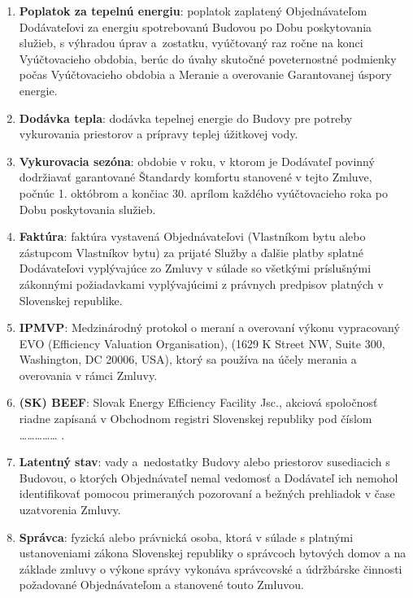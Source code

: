 \begin{multicols}{2}
\begin{enumerate}
\item\textbf{Poplatok za tepelnú energiu}: poplatok zaplatený Objednávateľom
Dodávateľovi za energiu spotrebovanú Budovou po Dobu poskytovania
služieb, s výhradou úprav a~zostatku, vyúčtovaný raz ročne na konci
Vyúčtovacieho obdobia, berúc do úvahy skutočné poveternostné podmienky
počas Vyúčtovacieho obdobia a Meranie a overovanie Garantovanej úspory
energie.

\item\textbf{Dodávka tepla}: dodávka tepelnej energie do Budovy pre potreby
vykurovania priestorov a prípravy teplej úžitkovej vody.

\item\textbf{Vykurovacia sezóna}: obdobie v roku, v ktorom je Dodávateľ
povinný dodržiavať garantované Štandardy komfortu stanovené v tejto
Zmluve, počnúc 1. októbrom a končiac 30. aprílom každého vyúčtovacieho
roka po Dobu poskytovania služieb.

\item\textbf{Faktúra}: faktúra vystavená Objednávateľovi (Vlastníkom bytu
alebo zástupcom Vlastníkov bytu) za prijaté Služby a ďalšie platby
splatné Dodávateľovi vyplývajúce zo Zmluvy v súlade so všetkými
príslušnými zákonnými požiadavkami vyplývajúcimi z právnych predpisov
platných v Slovenskej republike.

\item\textbf{IPMVP}: Medzinárodný protokol o meraní a overovaní výkonu
vypracovaný EVO (Efficiency Valuation Organisation), (1629 K Street NW,
Suite 300, Washington, DC 20006, USA), ktorý sa používa na účely merania
a overovania v rámci Zmluvy.

\item\textbf{(SK) BEEF}: Slovak Energy Efficiency Facility Jsc., akciová
spoločnosť riadne zapísaná v Obchodnom registri Slovenskej republiky pod
číslom \ldots\ldots\ldots\ldots\ldots{} .

\item\textbf{Latentný stav}: vady a~nedostatky Budovy alebo priestorov
susediacich s Budovou, o ktorých Objednávateľ nemal vedomosť a Dodávateľ
ich nemohol identifikovať pomocou primeraných pozorovaní a bežných
prehliadok v čase uzatvorenia Zmluvy.

\item\textbf{Správca}: fyzická alebo právnická osoba, ktorá v súlade s
platnými ustanoveniami zákona Slovenskej republiky o správcoch bytových
domov a na základe zmluvy o výkone správy vykonáva správcovské a
údržbárske činnosti požadované Objednávateľom a stanovené touto Zmluvou.


\end{enumerate}
\end{multicols}
